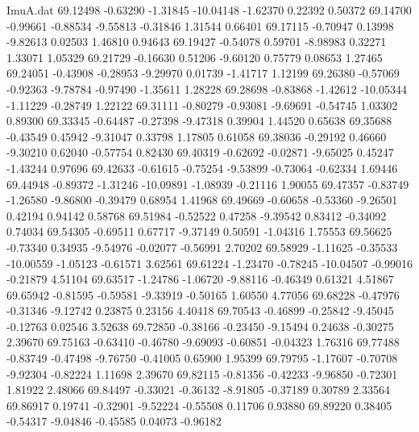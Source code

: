 \begin{filecontents}{ImuA.dat}
  69.12498   -0.63290   -1.31845  -10.04148   -1.62370    0.22392    0.50372
  69.14700   -0.99661   -0.88534   -9.55813   -0.31846    1.31544    0.66401
  69.17115   -0.70947    0.13998   -9.82613    0.02503    1.46810    0.94643
  69.19427   -0.54078    0.59701   -8.98983    0.32271    1.33071    1.05329
  69.21729   -0.16630    0.51206   -9.60120    0.75779    0.08653    1.27465
  69.24051   -0.43908   -0.28953   -9.29970    0.01739   -1.41717    1.12199
  69.26380   -0.57069   -0.92363   -9.78784   -0.97490   -1.35611    1.28228
  69.28698   -0.83868   -1.42612  -10.05344   -1.11229   -0.28749    1.22122
  69.31111   -0.80279   -0.93081   -9.69691   -0.54745    1.03302    0.89300
  69.33345   -0.64487   -0.27398   -9.47318    0.39904    1.44520    0.65638
  69.35688   -0.43549    0.45942   -9.31047    0.33798    1.17805    0.61058
  69.38036   -0.29192    0.46660   -9.30210    0.62040   -0.57754    0.82430
  69.40319   -0.62692   -0.02871   -9.65025    0.45247   -1.43244    0.97696
  69.42633   -0.61615   -0.75254   -9.53899   -0.73064   -0.62334    1.69446
  69.44948   -0.89372   -1.31246  -10.09891   -1.08939   -0.21116    1.90055
  69.47357   -0.83749   -1.26580   -9.86800   -0.39479    0.68954    1.41968
  69.49669   -0.60658   -0.53360   -9.26501    0.42194    0.94142    0.58768
  69.51984   -0.52522    0.47258   -9.39542    0.83412   -0.34092    0.74034
  69.54305   -0.69511    0.67717   -9.37149    0.50591   -1.04316    1.75553
  69.56625   -0.73340    0.34935   -9.54976   -0.02077   -0.56991    2.70202
  69.58929   -1.11625   -0.35533  -10.00559   -1.05123   -0.61571    3.62561
  69.61224   -1.23470   -0.78245  -10.04507   -0.99016   -0.21879    4.51104
  69.63517   -1.24786   -1.06720   -9.88116   -0.46349    0.61321    4.51867
  69.65942   -0.81595   -0.59581   -9.33919   -0.50165    1.60550    4.77056
  69.68228   -0.47976   -0.31346   -9.12742    0.23875    0.23156    4.40418
  69.70543   -0.46899   -0.25842   -9.45045   -0.12763    0.02546    3.52638
  69.72850   -0.38166   -0.23450   -9.15494    0.24638   -0.30275    2.39670
  69.75163   -0.63410   -0.46780   -9.69093   -0.60851   -0.04323    1.76316
  69.77488   -0.83749   -0.47498   -9.76750   -0.41005    0.65900    1.95399
  69.79795   -1.17607   -0.70708   -9.92304   -0.82224    1.11698    2.39670
  69.82115   -0.81356   -0.42233   -9.96850   -0.72301    1.81922    2.48066
  69.84497   -0.33021   -0.36132   -8.91805   -0.37189    0.30789    2.33564
  69.86917    0.19741   -0.32901   -9.52224   -0.55508    0.11706    0.93880
  69.89220    0.38405   -0.54317   -9.04846   -0.45585    0.04073   -0.96182

\end{filecontents}
